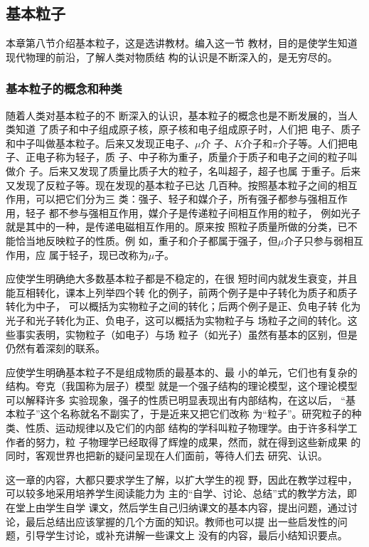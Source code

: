 \subsection{基本粒子}
本章第八节介绍基本粒子，这是选讲教材。编入这一节
教材，目的是使学生知道现代物理的前沿，了解人类对物质结
构的认识是不断深入的，是无穷尽的。

\subsubsection{基本粒子的概念和种类}

随着人类对基本粒子的不
断深入的认识，基本粒子的概念也是不断发展的，当人类知道
了质子和中子组成原子核，原子核和电子组成原子时，人们把
电子、质子和中子叫做基本粒子。后来又发现正电子、$\mu$介
子、$K$介子和$\pi$介子等。人们把电子、正电子称为轻子，质
子、中子称为重子，质量介于质子和电子之间的粒子叫做介
子。后来又发现了质量比质子大的粒子，名叫超子，超子也属
于重子。后来又发现了反粒子等。现在发现的基本粒子已达
几百种。按照基本粒子之间的相互作用，可以把它们分为三
类：强子、轻子和媒介子，所有强子都参与强相互作用，轻子
都不参与强相互作用，媒介子是传递粒子间相互作用的粒子，
例如光子就是其中的一种，是传递电磁相互作用的。原来按
照粒子质量所做的分类，已不能恰当地反映粒子的性质。例
如，重子和介子都属于强子，但$\mu$介子只参与弱相互作用，应
属于轻子，现已改称为$\mu$子。

应使学生明确绝大多数基本粒子都是不稳定的，在很
短时间内就发生衰变，并且能互相转化，课本上列举四个转
化的例子，前两个例子是中子转化为质子和质子转化为中子，
可以概括为实物粒子之间的转化；后两个例子是正、负电子转
化为光子和光子转化为正、负电子，这可以概括为实物粒子与
场粒子之间的转化。这些事实表明，实物粒子（如电子）与场
粒子（如光子）虽然有基本的区别，但是仍然有着深刻的联系。

应使学生明确基本粒子不是组成物质的最基本的、最
小的单元，它们也有复杂的结构。夸克（我国称为层子）模型
就是一个强子结构的理论模型，这个理论模型可以解释许多
实验现象，强子的性质已明显表现出有内部结构，在这以后，
“基本粒子”这个名称就名不副实了，于是近来又把它们改称
为“粒子”。研究粒子的种类、性质、运动规律以及它们的内部
结构的学科叫粒子物理学。由于许多科学工作者的努力，粒
子物理学已经取得了辉煌的成果，然而，就在得到这些新成果
的同时，客观世界也把新的疑问呈现在人们面前，等待人们去
研究、认识。

这一章的内容，大都只要求学生了解，以扩大学生的视
野，因此在教学过程中，可以较多地采用培养学生阅读能力为
主的“自学、讨论、总结”式的教学方法，即在堂上由学生自学
课文，然后学生自己归纳课文的基本内容，提出问题，通过讨
论，最后总结出应该掌握的几个方面的知识。教师也可以提
出一些启发性的问题，引导学生讨论，或补充讲解一些课文上
没有的内容，最后小结知识要点。

